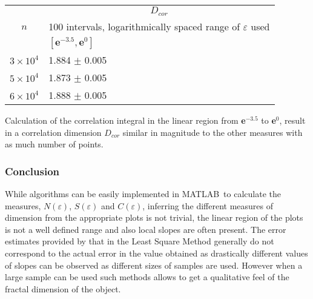 \begin{center}
\begin{tabular}{ |l|l| }

\hline
\multicolumn{1}{|c|}{\multirow{3}{*}{$n$}} & \multicolumn{1}{|c|}{$D_{cor} $}\\
\cline{2-2}
&\multicolumn{1}{|c|}{100 intervals, logarithmically spaced range of $\varepsilon$ used}\\
\cline{2-2}
 &\rule{0pt}{12pt}  \hspace{85pt} $[\boldsymbol{e}^{-3.5},\boldsymbol{e}^{0}]$  \\
\hline
$3\times 10^{4}$ & \hspace{80pt} 1.884 $\pm$ 0.005  \\
\hline
$5\times 10^{4}$ & \hspace{80pt} 1.873 $\pm$ 0.005 \\
\hline
$6\times 10^{4}$ & \hspace{80pt} 1.888 $\pm$ 0.005 \\
\hline
\end{tabular}
\end{center}
Calculation of the correlation integral in the linear region from \textbf{e$^{-3.5}$} to \textbf{e$^{0}$}, result in a correlation dimension $D_{cor}$ similar in magnitude to the other measures with as much number of points.
\vspace{20pt}
\subsubsection*{Conclusion}
While algorithms can be easily implemented in MATLAB\textregistered ~to calculate the measures, $N(\varepsilon)$, $S(\varepsilon)$ and $C(\varepsilon)$, inferring the different measures of dimension from the appropriate plots is not trivial, the linear region of the plots is not a well defined range and also local slopes are often present. The error estimates provided by that in the Least Square Method generally do not correspond to the actual error in the value obtained as drastically different values of slopes can be observed as different sizes of samples are used. However when a large sample can be used such methods allows to get a qualitative feel of the fractal dimension of the object.



\medskip
{}

